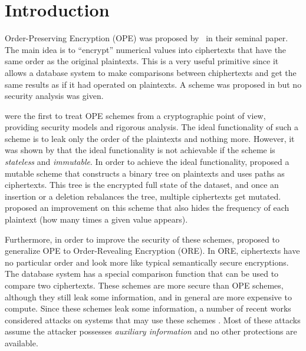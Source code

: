 \section{Introduction}

	Order-Preserving Encryption (OPE) was proposed by~\textcite{ope-original} in their seminal paper.
	The main idea is to ``encrypt'' numerical values into ciphertexts that have the same order as the original plaintexts.
	This is a very useful primitive since it allows a database system to make comparisons between chiphertexts and get the same results as if it had operated on plaintexts.
	A scheme was proposed in \cite{ope-original} but no security analysis was given.

	\textcite{bclo-ope} were the first to treat OPE schemes from a cryptographic point of view, providing security models and rigorous analysis.
	The ideal functionality of such a scheme is to leak only the order of the plaintexts and nothing more.
	However, it was shown by \textcite{bclo-ope} that the ideal functionality is not achievable if the scheme is \emph{stateless} and \emph{immutable}.
	In order to achieve the ideal functionality, \textcite{ope-ideal-security-protocol} proposed a mutable scheme that constructs a binary tree on plaintexts and uses paths as ciphertexts.
	This tree is the encrypted full state of the dataset, and once an insertion or a deletion rebalances the tree, multiple ciphertexts get mutated.
	\textcite{fh-ope} proposed an improvement on this scheme that also hides the frequency of each plaintext (how many times a given value appears).

	Furthermore, in order to improve the security of these schemes, \textcite{ore-original} proposed to generalize OPE to Order\hyp{}Revealing Encryption (ORE).
	In ORE, ciphertexts have no particular order and look more like typical semantically secure encryptions.
	The database system has a special comparison function that can be used to compare two ciphertexts.
	These schemes are more secure than OPE schemes, although they still leak some information, and in general are more expensive to compute.
	Since these schemes leak some information, a number of recent works considered attacks on systems that may use these schemes \cite{access-pattern-disclosure, inference-attack-islam-14, inference-attacks-naveed-15, grubbs-attacks, generic-attacks-kellaris, leakage-abuse-attacks-cash-15, attacks-what-else-revealed, attacks-improved-reconstruction, attacks-tao-of-inference, attacks-ore-injection}.
	Most of these attacks assume the attacker possesses \emph{auxiliary information} and no other protections are available.

